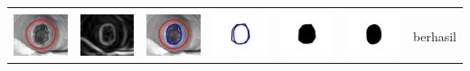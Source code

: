 \begin{table}[H]
\begin{tabular}{|m{0.7in}|m{0.7in}|m{0.7in}|m{0.7in}|m{0.7in}|m{0.7in}|m{0.7in}|}
		&  &  & & & &  \\
		\includegraphics[width=0.7in]{dataset/dataset_3/luka_hitam/ready/7_interp_init.jpg}&
		\includegraphics[width=0.7in]{dataset/dataset_3/luka_hitam/ready/7_interp_ext.jpg}&
		\includegraphics[width=0.7in]{dataset/dataset_3/luka_hitam/ready/7_interp_result.jpg}&
		\includegraphics[width=0.7in]{dataset/dataset_3/luka_hitam/ready/7_gt_r.jpg}&
		\includegraphics[width=0.7in]{dataset/dataset_3/luka_hitam/ready/7_r.jpg}&
		\includegraphics[width=0.7in]{dataset/dataset_3/luka_hitam/ready/7_interp_r.jpg}&
		berhasil\\
		\hline
		

\end{tabular}
\end{table}
